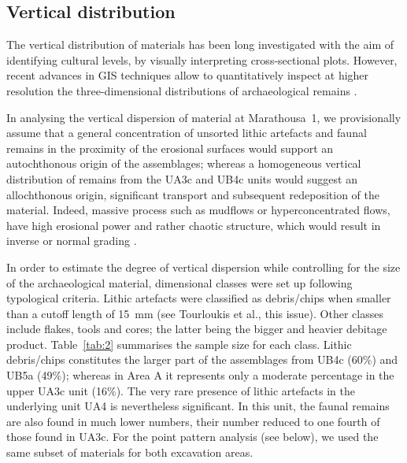 \documentclass[preprint,authoryear,times]{elsarticle} %
\begin{document}
\subsection{Vertical distribution}

The vertical distribution of materials has been long investigated with the aim of identifying cultural levels, by visually interpreting cross-sectional plots. However, recent advances in GIS techniques allow to quantitatively inspect at higher resolution the three-dimensional distributions of archaeological remains \citep[][among others]{McPherron2005a,Anderson2008}.

In analysing the vertical dispersion of material at Marathousa~1, we provisionally assume that a general concentration of unsorted lithic artefacts and faunal remains in the proximity of the erosional surfaces would support an autochthonous origin of the assemblages; whereas a homogeneous vertical distribution of remains from the UA3c and UB4c units would suggest an allochthonous origin, significant transport and subsequent redeposition of the material. Indeed, massive process such as mudflows or hyperconcentrated flows, have high erosional power and rather chaotic structure, which would result in inverse \citep{Lowe1982} or normal grading \citep{Sohn1997}.

In order to estimate the degree of vertical dispersion while controlling for the size of the archaeological material, dimensional classes were set up following typological criteria. Lithic artefacts were classified as debris/chips when smaller than a cutoff length of 15~mm (see Tourloukis et al., this issue). Other classes include flakes, tools and cores; the latter being the bigger and heavier debitage product. Table~\ref{tab:2} summarises the sample size for each class. Lithic debris/chips constitutes the larger part of the assemblages from UB4c (60\%) and UB5a (49\%); whereas in Area A it represents only a moderate percentage in the upper UA3c unit (16\%). The very rare presence of lithic artefacts in the underlying unit UA4 is nevertheless significant. In this unit, the faunal remains are also found in much lower numbers, their number reduced to one fourth of those found in UA3c. For the point pattern analysis (see below), we used the same subset of materials for both excavation areas.
\end{document}
